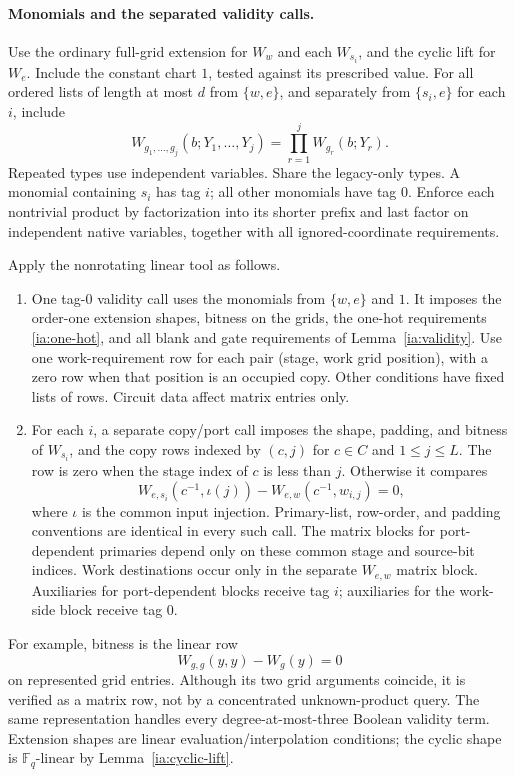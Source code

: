 \paragraph{Monomials and the separated validity calls.}
Use the ordinary full-grid extension for $W_w$ and each $W_{s_i}$,
and the cyclic lift for $W_e$.  Include the constant chart $1$,
tested against its prescribed value.  For all ordered lists of length
at most $d$ from $\{w,e\}$, and separately from $\{s_i,e\}$ for
each $i$, include
\begin{equation}
 W_{g_1,\ldots,g_j}(b;Y_1,\ldots,Y_j)
    =\prod_{r=1}^j W_{g_r}(b;Y_r).                 \label{ia:monomial-charts}
\end{equation}
Repeated types use independent variables.  Share the legacy-only
types.  A monomial containing $s_i$ has tag $i$; all other monomials
have tag $0$.  Enforce each nontrivial product by factorization into
its shorter prefix and last factor on independent native variables,
together with all ignored-coordinate requirements.

Apply the nonrotating linear tool as follows.
\begin{enumerate}
\item One tag-$0$ validity call uses the monomials from $\{w,e\}$
and $1$.  It imposes the order-one extension shapes, bitness on the
grids, the one-hot requirements \eqref{ia:one-hot}, and all blank and
gate requirements of Lemma~\ref{ia:validity}.  Use one work-requirement
row for each pair (stage, work grid position), with a zero row when
that position is an occupied copy.  Other conditions have fixed
lists of rows.  Circuit data affect matrix entries only.
\item For each $i$, a separate copy/port call imposes the shape,
padding, and bitness of $W_{s_i}$, and the copy rows indexed by
$(c,j)$ for $c\in C$ and $1\le j\le L$.  The row is zero when
the stage index of $c$ is less than $j$.  Otherwise it compares
\begin{equation}
 W_{e,s_i}(c^{-1},\iota(j))
     -W_{e,w}(c^{-1},w_{i,j})=0,                  \label{ia:separate-copy-row}
\end{equation}
where $\iota$ is the common input injection.  Primary-list, row-order,
and padding conventions are identical in every such call.  The
matrix blocks for port-dependent primaries depend only on these
common stage and source-bit indices.  Work destinations occur only
in the separate $W_{e,w}$ matrix block.  Auxiliaries for port-dependent
blocks receive tag $i$; auxiliaries for the work-side block receive
tag $0$.
\end{enumerate}
For example, bitness is the linear row
\[
 W_{g,g}(y,y)-W_g(y)=0
\]
on represented grid entries.  Although its two grid arguments
coincide, it is verified as a matrix row, not by a concentrated
unknown-product query.  The same representation handles every
degree-at-most-three Boolean validity term.  Extension shapes are
linear evaluation/interpolation conditions; the cyclic shape is
$\mathbb F_q$-linear by Lemma~\ref{ia:cyclic-lift}.

